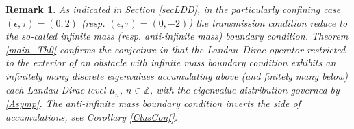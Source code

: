 \documentclass[11pt,a4paper,reqno,oneside]{amsproc}
\def \zz {{\mathbb Z}}
\numberwithin{equation}{section}
\newtheorem{remark}[definition]{Remark}
\begin{document}
\begin{remark}\label{rqconf} As indicated in Section \ref{secLDD}, in the particularly confining  case $(\epsilon, \tau)=(0, 2)$ (resp. $(\epsilon, \tau)=(0, - 2)$) the transmission condition reduce to the so-called \textit{infinite mass} (resp. \textit{anti-infinite mass}) boundary condition.  Theorem \ref{main_Th0} confirms the conjecture in \cite{BM} that the Landau--Dirac operator  restricted to  the exterior of an obstacle with \textit{infinite mass} boundary condition exhibits an infinitely many discrete eigenvalues accumulating above (and finitely many below) each Landau-Dirac level $\mu_n$, $ n \in \zz$, with the eigenvalue distribution governed by \eqref{Asymp}. The \textit{anti-infinite mass} boundary condition inverts the side of accumulations, see Corollary \ref{ClusConf}.
\end{remark}
\end{document}
